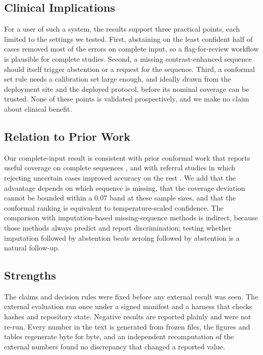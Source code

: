 \documentclass[journal]{IEEEtran}
\begin{document}
\subsection{Clinical Implications}
For a user of such a system, the results support three practical points, each limited to the settings we tested. First, abstaining on the least confident half of cases removed most of the errors on complete input, so a flag-for-review workflow is plausible for complete studies. Second, a missing contrast-enhanced sequence should itself trigger abstention or a request for the sequence. Third, a conformal set rule needs a calibration set large enough, and ideally drawn from the deployment site and the deployed protocol, before its nominal coverage can be trusted. None of these points is validated prospectively, and we make no claim about clinical benefit.

\subsection{Relation to Prior Work}
Our complete-input result is consistent with prior conformal work that reports useful coverage on complete sequences \cite{elyassirad2026}, and with referral studies in which rejecting uncertain cases improved accuracy on the rest \cite{leibig2017,olsson2022}. We add that the advantage depends on which sequence is missing, that the coverage deviation cannot be bounded within a 0.07 band at these sample sizes, and that the conformal ranking is equivalent to temperature-scaled confidence. The comparison with imputation-based missing-sequence methods \cite{liang2026risen} is indirect, because those methods always predict and report discrimination; testing whether imputation followed by abstention beats zeroing followed by abstention is a natural follow-up.

\subsection{Strengths}
The claims and decision rules were fixed before any external result was seen. The external evaluation ran once under a signed manifest and a harness that checks hashes and repository state. Negative results are reported plainly and were not re-run. Every number in the text is generated from frozen files, the figures and tables regenerate byte for byte, and an independent recomputation of the external numbers found no discrepancy that changed a reported value.
\end{document}
